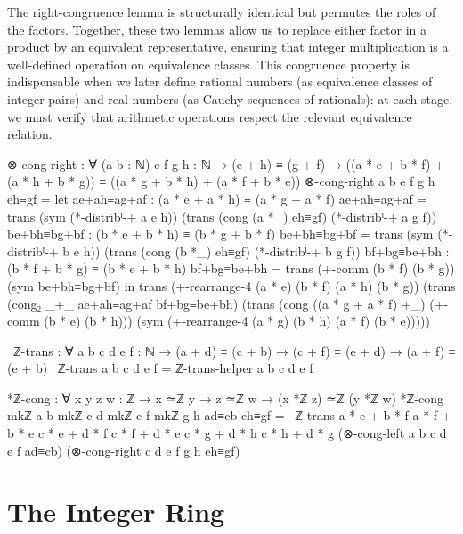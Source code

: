 \documentclass[11pt,a4paper]{book}
\begin{document}
The right-congruence lemma is structurally identical but permutes the roles of the factors. Together, these two lemmas allow us to replace either factor in a product by an equivalent representative, ensuring that integer multiplication is a well-defined operation on equivalence classes. This congruence property is indispensable when we later define rational numbers (as equivalence classes of integer pairs) and real numbers (as Cauchy sequences of rationals): at each stage, we must verify that arithmetic operations respect the relevant equivalence relation.

\begin{code}
⊗-cong-right : ∀ (a b : ℕ) {e f g h : ℕ}
             → (e + h) ≡ (g + f)
             → ((a * e + b * f) + (a * h + b * g)) ≡ ((a * g + b * h) + (a * f + b * e))
⊗-cong-right a b {e} {f} {g} {h} eh≡gf =
  let ae+ah≡ag+af : (a * e + a * h) ≡ (a * g + a * f)
      ae+ah≡ag+af = trans (sym (*-distribˡ-+ a e h))
                          (trans (cong (a *_) eh≡gf)
                                 (*-distribˡ-+ a g f))
      be+bh≡bg+bf : (b * e + b * h) ≡ (b * g + b * f)
      be+bh≡bg+bf = trans (sym (*-distribˡ-+ b e h))
                          (trans (cong (b *_) eh≡gf)
                                 (*-distribˡ-+ b g f))
      bf+bg≡be+bh : (b * f + b * g) ≡ (b * e + b * h)
      bf+bg≡be+bh = trans (+-comm (b * f) (b * g)) (sym be+bh≡bg+bf)
  in trans (+-rearrange-4 (a * e) (b * f) (a * h) (b * g))
           (trans (cong₂ _+_ ae+ah≡ag+af bf+bg≡be+bh)
                  (trans (cong ((a * g + a * f) +_) (+-comm (b * e) (b * h)))
                         (sym (+-rearrange-4 (a * g) (b * h) (a * f) (b * e)))))
\end{code}

\begin{code}
~ℤ-trans : ∀ {a b c d e f : ℕ} → (a + d) ≡ (c + b) → (c + f) ≡ (e + d) → (a + f) ≡ (e + b)
~ℤ-trans {a} {b} {c} {d} {e} {f} = ℤ-trans-helper a b c d e f

*ℤ-cong : ∀ {x y z w : ℤ} → x ≃ℤ y → z ≃ℤ w → (x *ℤ z) ≃ℤ (y *ℤ w)
*ℤ-cong {mkℤ a b} {mkℤ c d} {mkℤ e f} {mkℤ g h} ad≡cb eh≡gf =
  ~ℤ-trans {a * e + b * f} {a * f + b * e}
           {c * e + d * f} {c * f + d * e}
           {c * g + d * h} {c * h + d * g}
           (⊗-cong-left {a} {b} {c} {d} e f ad≡cb)
           (⊗-cong-right c d {e} {f} {g} {h} eh≡gf)
\end{code}

\section{The Integer Ring}
\end{document}
